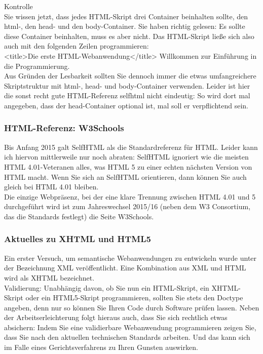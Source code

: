 Kontrolle\\

Sie wissen jetzt, dass jedes HTML-Skript drei Container beinhalten sollte, den html-, den head- und den body-Container. Sie haben richtig gelesen: Es sollte diese Container beinhalten, muss es aber nicht. Das HTML-Skript ließe sich also auch mit den folgenden Zeilen programmieren:\\

<title>Die erste HTML-Webanwendung</title>
Willkommen zur Einführung in die Programmierung.\\

Aus Gründen der Lesbarkeit sollten Sie dennoch immer die etwas umfangreichere Skriptstruktur mit html-, head- und body-Container verwenden. Leider ist hier die sonst recht gute HTML-Referenz selfhtml nicht eindeutig: So wird dort mal angegeben, dass der head-Container optional ist, mal soll er verpflichtend sein.

\subsubsection{HTML-Referenz: W3Schools}

Bis Anfang 2015 galt SelfHTML als die Standardreferenz für HTML. Leider kann ich hiervon mittlerweile nur noch abraten: SelfHTML ignoriert wie die meisten HTML 4.01-Veteranen alles, was HTML 5 zu einer echten nächsten Version von HTML macht. Wenn Sie sich an SelfHTML orientieren, dann können Sie auch gleich bei HTML 4.01 bleiben.\\

Die einzige Webpräsenz, bei der eine klare Trennung zwischen HTML 4.01 und 5 durchgeführt wird ist zum Jahreswechsel 2015/16 (neben dem W3 Consortium, das die Standards festlegt) die Seite W3Schools.

\subsubsection{Aktuelles zu XHTML und HTML5}

Ein erster Versuch, um semantische Webanwendungen zu entwickeln wurde unter der Bezeichnung XML veröffentlicht. Eine Kombination aus XML und HTML wird als XHTML bezeichnet.\\

Validierung: Unabhängig davon, ob Sie nun ein HTML-Skript, ein XHTML-Skript oder ein HTML5-Skript programmieren, sollten Sie stets den Doctype angeben, denn nur so können Sie Ihren Code durch Software prüfen lassen. Neben der Arbeitserleichterung folgt hieraus auch, dass Sie sich rechtlich etwas absichern: Indem Sie eine validierbare Webanwendung programmieren zeigen Sie, dass Sie nach den aktuellen technischen Standards arbeiten. Und das kann sich im Falle eines Gerichtsverfahrens zu Ihren Gunsten auswirken.\\

